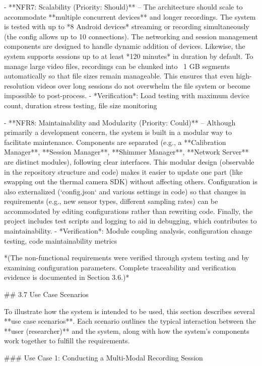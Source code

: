 \documentclass[12pt,a4paper]{article}
\begin{document}
- **NFR7: Scalability (Priority: Should)** -- The architecture should scale to accommodate **multiple concurrent devices** and longer recordings. The system is tested with up to *8 Android devices* streaming or recording simultaneously (the config allows up to 10 connections). The networking and session management components are designed to handle dynamic addition of devices. Likewise, the system supports sessions up to at least *120 minutes* in duration by default. To manage large video files, recordings can be chunked into ~1 GB segments automatically so that file sizes remain manageable. This ensures that even high-resolution videos over long sessions do not overwhelm the file system or become impossible to post-process.
  - *Verification*: Load testing with maximum device count, duration stress testing, file size monitoring

- **NFR8: Maintainability and Modularity (Priority: Could)** -- Although primarily a development concern, the system is built in a modular way to facilitate maintenance. Components are separated (e.g., a **Calibration Manager**, **Session Manager**, **Shimmer Manager**, **Network Server** are distinct modules), following clear interfaces. This modular design (observable in the repository structure and code) makes it easier to update one part (like swapping out the thermal camera SDK) without affecting others. Configuration is also externalized (`config.json` and various settings in code) so that changes in requirements (e.g., new sensor types, different sampling rates) can be accommodated by editing configurations rather than rewriting code. Finally, the project includes test scripts and logging to aid in debugging, which contributes to maintainability.
  - *Verification*: Module coupling analysis, configuration change testing, code maintainability metrics

*(The non-functional requirements were verified through system testing and by examining configuration parameters. Complete traceability and verification evidence is documented in Section 3.6.)*

## 3.7 Use Case Scenarios

To illustrate how the system is intended to be used, this section
describes several **use case scenarios**. Each scenario outlines the
typical interaction between the **user (researcher)** and the system,
along with how the system's components work together to fulfill the
requirements.

### Use Case 1: Conducting a Multi-Modal Recording Session
\end{document}
